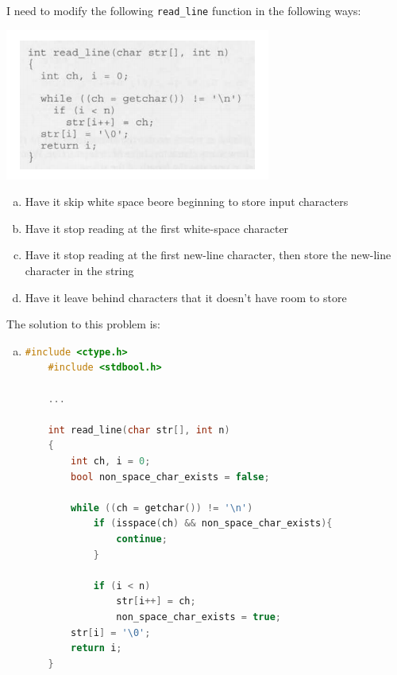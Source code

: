 \documentclass[12pt]{article}
\begin{document}
\begin{enumerate}[1.]
    I need to modify the following \texttt{read\_line} function in the following ways:

    \begin{center}
    \includegraphics[width=0.7\linewidth]{images/review_6_solution_1.png}
    \end{center}

    \begin{enumerate}[a)]
        \item Have it skip white space beore beginning to store input characters
        \item Have it stop reading at the first white-space character
        \item Have it stop reading at the first new-line character, then store the new-line character in the string
        \item Have it leave behind characters that it doesn't have room to store
    \end{enumerate}

    \bigskip

    The solution to this problem is:

    \begin{enumerate}[a)]
        \item

\begin{lstlisting}[language=c]
    #include <ctype.h>
    #include <stdbool.h>

    ...

    int read_line(char str[], int n)
    {
        int ch, i = 0;
        bool non_space_char_exists = false;

        while ((ch = getchar()) != '\n')
            if (isspace(ch) && non_space_char_exists){
                continue;
            }

            if (i < n)
                str[i++] = ch;
                non_space_char_exists = true;
        str[i] = '\0';
        return i;
    }
\end{lstlisting}


\end{enumerate}
\end{enumerate}
\end{document}
